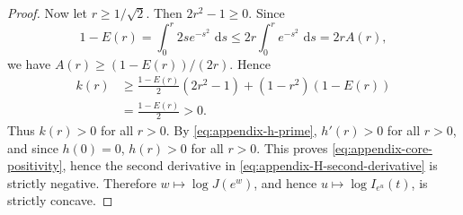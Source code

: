 \documentclass[10pt,a4paper]{amsart}
\newcommand{\dd}{\,\mathrm{d}}
\begin{document}
\begin{proof}
Now let \(r\geq1/\sqrt2\).  Then \(2r^2-1\geq0\).  Since
\[
    1-E(r)
    =\int_0^r 2s e^{-s^2}\,\dd s
    \leq
    2r\int_0^r e^{-s^2}\,\dd s
    =2rA(r),
\]
we have \(A(r)\geq(1-E(r))/(2r)\).  Hence
\[
\begin{split}
    k(r)
    &\geq
    \frac{1-E(r)}{2}(2r^2-1)
    +(1-r^2)(1-E(r))  \\
    &=
    \frac{1-E(r)}{2}>0.
\end{split}
\]
Thus \(k(r)>0\) for all \(r>0\).  By \eqref{eq:appendix-h-prime},
\(h'(r)>0\) for all \(r>0\), and since \(h(0)=0\), \(h(r)>0\) for all
\(r>0\).  This proves \eqref{eq:appendix-core-positivity}, hence the second
derivative in \eqref{eq:appendix-H-second-derivative} is strictly negative.
Therefore \(w\mapsto\log J(e^w)\), and hence
\(u\mapsto\log I_{e^u}(t)\), is strictly concave.
\end{proof}
\end{document}
